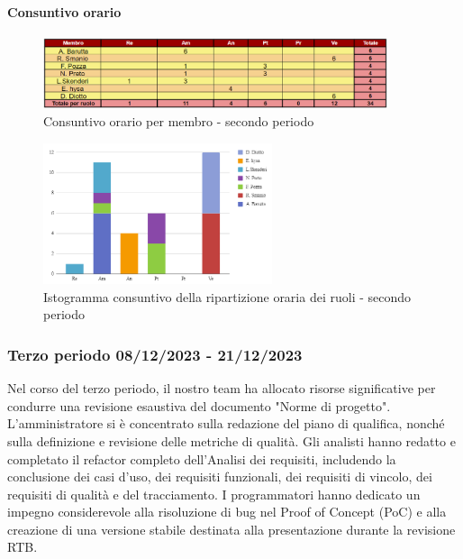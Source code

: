 \paragraph{Consuntivo orario } \hspace{1pt}

\begin{figure}[H]
    \centering
    \includegraphics[width=0.9\textwidth]{../Images/consuntivoOrario2Periodo.png}
    \caption{Consuntivo orario per membro - secondo periodo}
    \label{fig:Constuntivo_orario_2}
\end{figure}

\begin{figure}[H]
    \centering
    \includegraphics[width=0.6\textwidth]{../Images/consuntivoDivisioneRuoli2Periodo.png}
    \caption{Istogramma consuntivo della ripartizione oraria dei ruoli - secondo periodo}
    \label{fig:Consuntivo_ripartizione_oraria_2}
\end{figure}




\subsubsection{Terzo periodo  08/12/2023 - 21/12/2023}
Nel corso del terzo periodo, il nostro team ha allocato risorse significative per condurre una revisione esaustiva del documento "Norme di progetto". L'amministratore si è concentrato sulla redazione del piano di qualifica, nonché sulla definizione e revisione delle metriche di qualità. Gli analisti hanno redatto e completato il refactor completo dell'Analisi dei requisiti, includendo la conclusione dei casi d'uso, dei requisiti funzionali, dei requisiti di vincolo, dei requisiti di qualità e del tracciamento. I programmatori hanno dedicato un impegno considerevole alla risoluzione di bug nel Proof of Concept (PoC) e alla creazione di una versione stabile destinata alla presentazione durante la revisione RTB.

